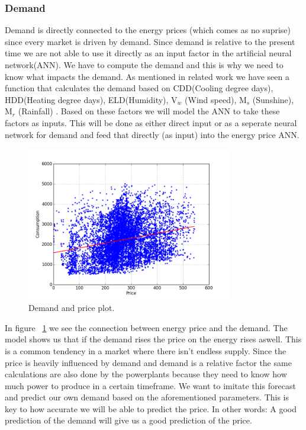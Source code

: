 
\subsubsection{Demand}
Demand is directly connected to the energy prices (which comes as no suprise) since every market is driven by demand. Since demand is relative to the present time we are not able to use it directly as an input factor in the artificial neural network(ANN). We have to compute the demand and this is why we need to know what impacts the demand. As mentioned in related work we have seen a function that calculates the demand based on CDD(Cooling degree days), HDD(Heating degree days), ELD(Humidity), V$_w$ (Wind speed), M$_s$ (Sunshine), M$_r$ (Rainfall) \cite{19}. Based on these factors we will model the ANN to take these factors as inputs. This will be done as either direct input or as a seperate neural network for demand and feed that directly (as input) into the energy price ANN.

\begin{figure}[H]
\centering
\includegraphics[width=0.8\textwidth ,natwidth=410,natheight=237]{billeder/energy_price_plots/consump_price.png}
\caption{Demand and price plot.}
\label{fig:consump_price}
\end{figure}

In figure ~\ref{fig:consump_price} we see the connection between energy price and the demand. The model shows us that if the demand rises the price on the energy rises aswell. This is a common tendency in a market where there isn't endless supply. Since the price is heavily influenced by demand and demand is a relative factor the same calculations are also done by the powerplants because they need to know how much power to produce in a certain timeframe. We want to imitate this forecast and predict our own demand based on the aforementioned parameters. This is key to how accurate we will be able to predict the price. In other words: A good prediction of the demand will give us a good prediction of the price.

